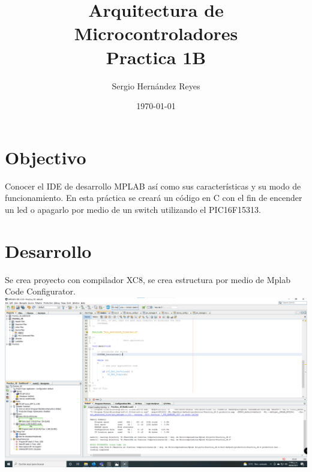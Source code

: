 \documentclass{article}
\title{Arquitectura de Microcontroladores \\ Practica 1B} %
\author{Sergio Hernández Reyes} %
\date{\today} %
\begin{document}
\maketitle %



\section{Objectivo}

Conocer el IDE de desarrollo MPLAB así como sus características y su modo de funcionamiento. En esta práctica se creará un código en C con el fin de encender un led o apagarlo por medio de un switch utilizando el PIC16F15313.



\section{Desarrollo}
Se crea proyecto con compilador XC8, se crea estructura por medio de Mplab Code Configurator.\\
\includegraphics[width=\textwidth]{mplab}\\
\newline
\newline
\end{document}

